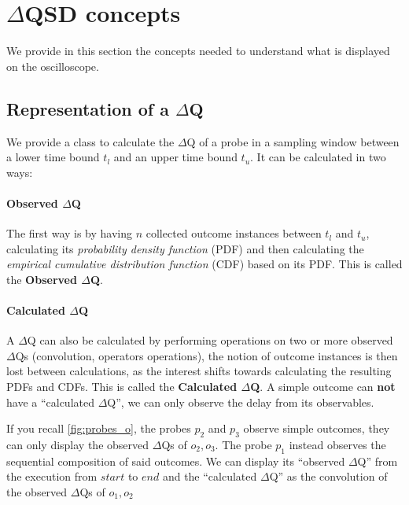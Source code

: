 \section{$\Delta$QSD concepts}

    We provide in this section the concepts needed to understand what is displayed on the oscilloscope.

\subsection{Representation of a $\Delta$Q}
    We provide a class to calculate the $\Delta$Q of a probe in a sampling window between a lower time bound $t_l$ and an upper time bound $t_u$. It can be calculated in two ways: 
    
    \paragraph{Observed $\Delta$Q}
    
    The first way is by having $n$ collected outcome instances between $t_l$ and $t_u$, calculating its \textit{probability density function} (PDF) and then calculating the \textit{empirical cumulative distribution function} (CDF) based on its PDF. This is called the \textbf{Observed $\Delta$Q}.
    
    \paragraph{Calculated $\Delta$Q}
    
    A $\Delta$Q can also be calculated by performing operations on two or more observed $\Delta$Qs (convolution, operators operations), the notion of outcome instances is then lost between calculations, as the interest shifts towards calculating the resulting PDFs and CDFs. This is called the \textbf{Calculated $\Delta$Q}. A simple outcome can \textbf{not} have a ``calculated $\Delta$Q'', we can only observe the delay from its observables.

    If you recall \cref{fig:probes_o}, the probes $p_2$ and $p_3$ observe simple outcomes, they can only display the observed $\Delta$Qs of $o_2, o_3$. The probe $p_1$ instead observes the sequential composition of said outcomes. We can display its ``observed $\Delta$Q'' from the execution from $start$ to $end$ and the ``calculated $\Delta$Q'' as the convolution of the observed $\Delta$Qs of $o_1, o_2$
        
